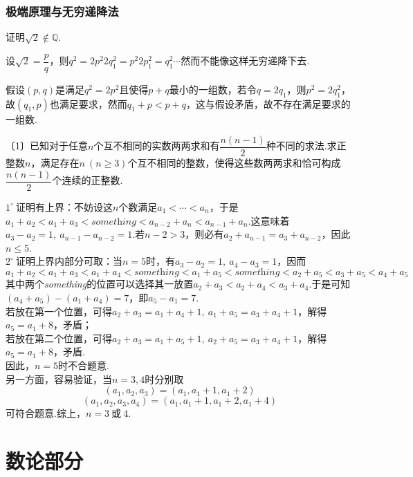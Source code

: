 \documentclass[lang=cn, zihao=4.5]{elegantbook}
\newcommand{\nd}[1]{〔#1〕}
\newcommand{\buzhou}[1]{$#1^{\circ} \ $}
\begin{document}
\section{极端原理与无穷递降法}

\begin{instance}
	证明$\sqrt{2} \notin \mathbb{Q}$.
\end{instance}
\begin{solution}
	\begin{guess}
		设$\sqrt{2}=\dfrac{p}{q}$，则$q^2=2p^2$$2q_1^2=p^2$$2p_1^2=q_1^2 \cdots$然而不能像这样无穷递降下去.
	\end{guess}
	假设$(p,q)$是满足$q^2=2p^2$且使得$p+q$最小的一组数，若令$q=2q_1$，则$p^2=2q_1^2$，故$(q_1,p)$也满足要求，然而$q_1+p<p+q$，这与假设矛盾，故不存在满足要求的一组数.
\end{solution}

\begin{example} %
	\nd{1}已知对于任意$n$个互不相同的实数两两求和有$\dfrac{n(n-1)}{2}$种不同的求法.求正整数$n$，满足存在$n~(n \geq 3)$个互不相同的整数，使得这些数两两求和恰可构成$\dfrac{n(n-1)}{2}$个连续的正整数.
\end{example}
\begin{solution}
	\buzhou{1}证明有上界：不妨设这$n$个数满足$a_1< \cdots <a_n$，于是$a_1+a_2<a_1+a_3< \textit{something} <a_{n-2}+a_n<a_{n-1}+a_n$.这意味着$a_3-a_2=1,~a_{n-1}-a_{n-2}=1$.若$n-2>3$，则必有$a_2+a_{n-1} = a_3+a_{n-2}$，因此$n \leq 5$. \\
	\buzhou{2}证明上界内部分可取：当$n=5$时，有$a_3-a_2=1,~a_4-a_3=1$，因而$$a_1+a_2 < a_1+a_3 < a_1+a_4 < \textit{something} < a_1+a_5 < \textit{something} <a_2+a_5 < a_3+a_5 < a_4+a_5$$
	其中两个\textit{something}的位置可以选择其一放置$a_2+a_3 < a_2+a_4 < a_3+a_4$.于是可知$(a_4+a_5) - (a_1+a_4)=7$，即$a_5-a_1=7$. \\
	若放在第一个位置，可得$a_2+a_3=a_1+a_4+1,~a_1+a_5=a_3+a_4+1$，解得$a_5=a_1+8$，矛盾； \\
	若放在第二个位置，可得$a_2+a_3=a_1+a_5+1,~a_2+a_5=a_3+a_4+1$，解得$a_5=a_1+8$，矛盾. \\
	因此，$n=5$时不合题意. \\
	另一方面，容易验证，当$n=3,4$时分别取
	$$(a_1,a_2,a_3) = (a_1,a_1+1,a_1+2)$$
	$$(a_1,a_2,a_3,a_4) = (a_1,a_1+1,a_1+2,a_1+4)$$
	可符合题意.综上，$n=3~ \textit{或} ~4$.
\end{solution}

\part{数论部分}
\end{document}
